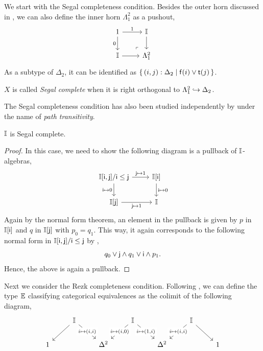 We start with the Segal completeness condition. Besides the outer horn discussed in , we can also define the inner horn $\Lambda^2_1$ as a pushout,
\[
  \begin{tikzcd}
    1 \ar[d, "0"'] \ar[r, "1"] & \I \ar[d] \\
    \I \ar[r] & \Lambda^2_1
    \arrow["\lrcorner"{anchor=center, pos=0.125, rotate=180}, draw=none, from=2-2, to=1-1]
  \end{tikzcd}
\]
As a subtype of $\Delta_2$, it can be identified as $\{\,(i,j) : \Delta_2\mid\mathsf{f}(i) \vee \mathsf{t}(j)\,\}$.

\begin{definition}
  $X$ is called \emph{Segal complete} when it is right orthogonal to $\Lambda^2_1 \hookrightarrow \Delta_2$.
\end{definition}

\begin{remark}
  The Segal completeness condition has also been studied independently by \citet{fiore2001domains} under the name of \emph{path transitivity}.
\end{remark}

\begin{proposition}[\AxiomSQCF]
  $\mathbb{I}$ is Segal complete.
\end{proposition}
\begin{proof}
  In this case, we need to show the following diagram is a pullback of $\mathbb{I}$-algebras, 
  \[
  \begin{tikzcd}
    \I[\ms{i},\ms{j}]/\ms{i}\le\ms{j} \ar[r, "\ms{j} \mapsto 1"] \ar[d, "\ms{i} \mapsto 0"'] & \I[\ms{i}] \ar[d, "\ms{i}\mapsto 0"] \\
    \I[\ms{j}] \ar[r, "\ms{j} \mapsto 1"'] & \I
  \end{tikzcd}
  \]
  Again by the normal form theorem, an element in the pullback is given by $p$ in $\mathbb{I}[\mathsf{i}]$ and $q$ in $\mathbb{I}[\mathsf{j}]$ with $p_0 = q_1$. This way, it again corresponds to the following normal form in $\mathbb{I}[\mathsf{i},\mathsf{j}]/\mathsf{i} \le \mathsf{j}$ by ,
  \[ q_0 \vee \ms{j} \wedge q_1 \vee \ms{i} \wedge p_1\text{.} \]
  Hence, the above is again a pullback.
\end{proof}

Next we consider the Rezk completeness condition. Following \citet{buchholtz2021synthetic}, we can define the type $\mathbb{E}$ classifying categorical equivalences as the colimit of the following diagram,
\[
\begin{tikzcd}
	& \I && \I && \I \\
	1 && {\Delta^2} && {\Delta^2} && 1
	\arrow[from=1-2, to=2-1]
	\arrow["{i \mapsto (i,i)}"{description}, from=1-2, to=2-3]
	\arrow["{i \mapsto (i,0)}"{description}, from=1-4, to=2-3]
	\arrow["{i \mapsto (1,i)}"{description}, from=1-4, to=2-5]
	\arrow["{i \mapsto (i,i)}"{description}, from=1-6, to=2-5]
	\arrow[from=1-6, to=2-7]
\end{tikzcd}
\]


